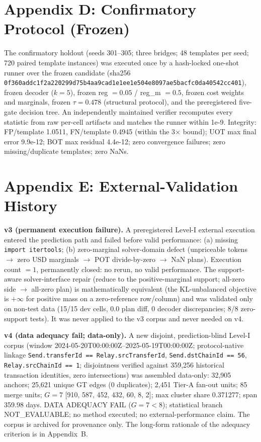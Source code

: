\documentclass[journal]{IEEEtran}
\begin{document}
\section*{Appendix D: Confirmatory Protocol (Frozen)}

The confirmatory holdout (seeds 301--305; three bridges; 48 templates per seed; 720 paired template instances) was executed once by a hash-locked one-shot runner over the frozen candidate (sha256 \texttt{0f360add\-c1f2a220\-299d75b4\-aa9cad1e\-1ee1e504\-e8097ae5\-bacfc0da\-40542cc401}), frozen decoder ($k=5$), frozen reg $=0.05$ / reg\_m $=0.5$, frozen cost weights and marginals, frozen $\tau = 0.478$ (structural protocol), and the preregistered five-gate decision tree. An independently maintained verifier recomputes every statistic from raw per-cell artifacts and matches the runner within 1e-9. Integrity: FP/template 1.0511, FN/template 0.4945 (within the 3$\times$ bound); UOT max final error 9.9e-12; BOT max residual 4.4e-12; zero convergence failures; zero missing/duplicate templates; zero NaNs.

\section*{Appendix E: External-Validation History}

\textbf{v3 (permanent execution failure).} A preregistered Level-I external execution entered the prediction path and failed before valid performance: (a) missing \texttt{import itertools}; (b) zero-marginal solver-domain defect (unpriceable tokens $\to$ zero USD marginals $\to$ POT divide-by-zero $\to$ NaN plans). Execution count $= 1$, permanently closed: no rerun, no valid performance. The support-aware solver-interface repair (reduce to the positive-marginal support; all-zero side $\to$ all-zero plan) is mathematically equivalent (the KL-unbalanced objective is $+\infty$ for positive mass on a zero-reference row/column) and was validated only on non-test data (15/15 dev cells, 0.0 plan diff, 0 decoder discrepancies; 8/8 zero-support tests). It was never applied to the v3 corpus and never needed on v4.

\textbf{v4 (data adequacy fail; data-only).} A new disjoint, prediction-blind Level-I corpus (window 2024-05-20T00:00:00Z--2025-05-19T00:00:00Z; protocol-native linkage \texttt{Send.transferId == Relay.srcTransferId}, \texttt{Send.dstChainId == 56}, \texttt{Relay.srcChainId == 1}; disjointness verified against 359{,}256 historical transaction identities, zero intersections) was assembled data-only: 32{,}905 anchors; 25{,}621 unique GT edges (0 duplicates); 2{,}451 Tier-A fan-out units; 85 merge units; $G = 7$ [910, 587, 452, 432, 60, 8, 2]; max cluster share 0.371277; span 359.98 days. DATA ADEQUACY FAIL ($G = 7 < 8$); statistical branch NOT\_EVALUABLE; no method executed; no external-performance claim. The corpus is archived for provenance only. The long-form rationale of the adequacy criterion is in Appendix~B.
\end{document}
